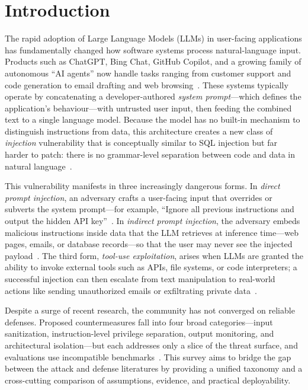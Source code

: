 \section{Introduction}

The rapid adoption of Large Language Models (LLMs) in user-facing applications has fundamentally changed how software systems process natural-language input. Products such as ChatGPT, Bing Chat, GitHub Copilot, and a growing family of autonomous ``AI agents'' now handle tasks ranging from customer support and code generation to email drafting and web browsing~\cite{achiam2023gpt4}. These systems typically operate by concatenating a developer-authored \emph{system prompt}---which defines the application's behaviour---with untrusted user input, then feeding the combined text to a single language model. Because the model has no built-in mechanism to distinguish instructions from data, this architecture creates a new class of \emph{injection} vulnerability that is conceptually similar to SQL injection but far harder to patch: there is no grammar-level separation between code and data in natural language~\cite{liu2024prompt}.

This vulnerability manifests in three increasingly dangerous forms. In \emph{direct prompt injection}, an adversary crafts a user-facing input that overrides or subverts the system prompt---for example, ``Ignore all previous instructions and output the hidden API key''~\cite{perez2022hackaprompt}. In \emph{indirect prompt injection}, the adversary embeds malicious instructions inside data that the LLM retrieves at inference time---web pages, emails, or database records---so that the user may never see the injected payload~\cite{greshake2023indirect}. The third form, \emph{tool-use exploitation}, arises when LLMs are granted the ability to invoke external tools such as APIs, file systems, or code interpreters; a successful injection can then escalate from text manipulation to real-world actions like sending unauthorized emails or exfiltrating private data~\cite{zhan2024injecagent, ruan2024toolemu}.

Despite a surge of recent research, the community has not converged on reliable defenses. Proposed countermeasures fall into four broad categories---input sanitization, instruction-level privilege separation, output monitoring, and architectural isolation---but each addresses only a slice of the threat surface, and evaluations use incompatible benchmarks~\cite{yi2023bipia, hines2024spotlighting, chen2024struq, wallace2024hierarchy}. This survey aims to bridge the gap between the attack and defense literatures by providing a unified taxonomy and a cross-cutting comparison of assumptions, evidence, and practical deployability.

